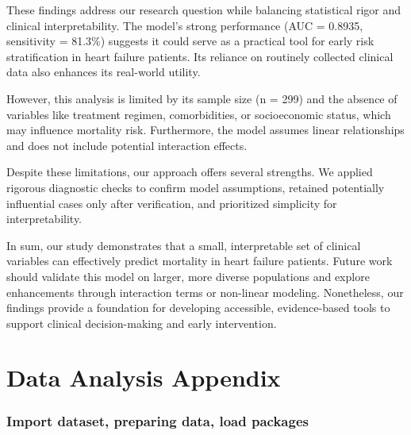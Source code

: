 \documentclass[
  letterpaper,
  DIV=11,
  numbers=noendperiod]{scrartcl}
\begin{document}
These findings address our research question while balancing statistical
rigor and clinical interpretability. The model's strong performance (AUC
= 0.8935, sensitivity = 81.3\%) suggests it could serve as a practical
tool for early risk stratification in heart failure patients. Its
reliance on routinely collected clinical data also enhances its
real-world utility.

However, this analysis is limited by its sample size (n = 299) and the
absence of variables like treatment regimen, comorbidities, or
socioeconomic status, which may influence mortality risk. Furthermore,
the model assumes linear relationships and does not include potential
interaction effects.

Despite these limitations, our approach offers several strengths. We
applied rigorous diagnostic checks to confirm model assumptions,
retained potentially influential cases only after verification, and
prioritized simplicity for interpretability.

In sum, our study demonstrates that a small, interpretable set of
clinical variables can effectively predict mortality in heart failure
patients. Future work should validate this model on larger, more diverse
populations and explore enhancements through interaction terms or
non-linear modeling. Nonetheless, our findings provide a foundation for
developing accessible, evidence-based tools to support clinical
decision-making and early intervention.

\hypertarget{data-analysis-appendix}{%
\section{Data Analysis Appendix}\label{data-analysis-appendix}}

\hypertarget{import-dataset-preparing-data-load-packages}{%
\subsubsection{Import dataset, preparing data, load
packages}\label{import-dataset-preparing-data-load-packages}}
\end{document}
